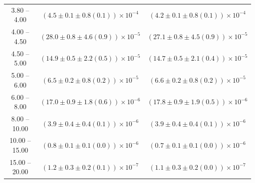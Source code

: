 \begin{table}
\begin{center}
\begin{tabular}{ c | c c }
3.80 -- 4.00 & $(4.5\pm0.1\pm0.8(0.1))\times10^{-4}$ & $(4.2\pm0.1\pm0.8(0.1))\times10^{-4}$ \\ 
4.00 -- 4.50 & $(28.0\pm0.8\pm4.6(0.9))\times10^{-5}$ & $(27.1\pm0.8\pm4.5(0.9))\times10^{-5}$ \\ 
4.50 -- 5.00 & $(14.9\pm0.5\pm2.2(0.5))\times10^{-5}$ & $(14.7\pm0.5\pm2.1(0.4))\times10^{-5}$ \\ 
5.00 -- 6.00 & $(6.5\pm0.2\pm0.8(0.2))\times10^{-5}$ & $(6.6\pm0.2\pm0.8(0.2))\times10^{-5}$ \\ 
6.00 -- 8.00 & $(17.0\pm0.9\pm1.8(0.6))\times10^{-6}$ & $(17.8\pm0.9\pm1.9(0.5))\times10^{-6}$ \\ 
8.00 -- 10.00 & $(3.9\pm0.4\pm0.4(0.1))\times10^{-6}$ & $(3.9\pm0.4\pm0.4(0.1))\times10^{-6}$ \\ 
10.00 -- 15.00 & $(0.8\pm0.1\pm0.1(0.0))\times10^{-6}$ & $(0.7\pm0.1\pm0.1(0.0))\times10^{-6}$ \\ 
15.00 -- 20.00 & $(1.2\pm0.3\pm0.2(0.1))\times10^{-7}$ & $(1.1\pm0.3\pm0.2(0.0))\times10^{-7}$ \\ 
\hline
\end{tabular}
\end{center}
\end{table}
 
